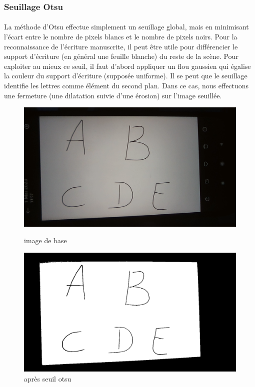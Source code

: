\documentclass[a4paper]{article}
\begin{document}
				\subsubsection{Seuillage Otsu}
				\paragraph{} La méthode d'Otsu effectue simplement un seuillage global, mais en minimisant l'écart entre le nombre de pixels blancs et le nombre de pixels noirs. Pour la reconnaissance de l'écriture manuscrite, il peut être utile pour différencier le support d'écriture (en général une feuille blanche) du reste de la scène.
				Pour exploiter au mieux ce seuil, il faut d'abord appliquer un flou gaussien qui égalise la couleur du support d'écriture (supposée uniforme). 
				Il se peut que le seuillage identifie les lettres comme élément du second plan. Dans ce cas, nous effectuons une fermeture (une dilatation suivie d'une érosion) sur l'image seuillée.
				

				\begin{figure}
					\centering
					\begin{minipage}{.5\textwidth}
					  \centering
					  \includegraphics[width=.8\linewidth]{sansOtsu.png}
					  \caption{image de base}
					  \label{fig:sansOtsu}
					\end{minipage}%
					\begin{minipage}{.5\textwidth}
					  \centering
					  \includegraphics[width=.8\linewidth]{apresOtsu.png}
					  \caption{après seuil otsu}
					  \label{fig:apresOtsu}
					\end{minipage}
				\end{figure}
\end{document}
